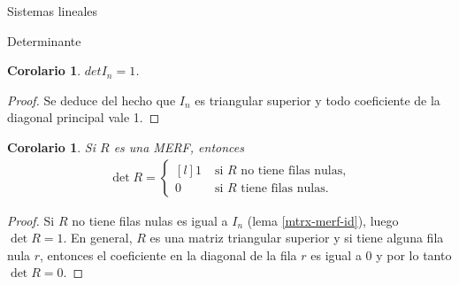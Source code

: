 \documentclass[a4paper,12pt,twoside,spanish]{amsbook}
\newtheorem{corolario}[teorema]{Corolario}
\theoremstyle{definition}
\theoremstyle{remark}
\begin{document}
\begin{chapter}{Sistemas lineales}
\begin{section}{Determinante}
	\begin{corolario}
		$det I_n = 1$.
	\end{corolario}
	\begin{proof}
		Se deduce del hecho que $I_n$  es triangular superior y todo coeficiente de la diagonal principal vale 1.
	\end{proof}
	
	\begin{corolario}
		Si $R$ es una MERF, entonces 
		\begin{align*}
		\det R = \left\{ \begin{matrix*}[l]
		1 \;&\text{si $R$ no tiene filas nulas,}\\
		0&\text{si $R$ tiene filas nulas.}
		\end{matrix*}\right.  
		\end{align*}
	\end{corolario}
	\begin{proof}
		Si $R$ no tiene filas nulas es igual a $I_n$ (lema \ref{mtrx-merf-id}), luego $\det R = 1$. En general, $R$ es una matriz triangular superior y si tiene alguna fila nula $r$, entonces el coeficiente en la diagonal de la fila $r$ es igual a $0$ y por lo tanto 	$\det R = 0$.
	\end{proof}


\end{section}
\end{chapter}
\end{document}
